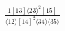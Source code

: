 \documentclass[varwidth, border=5pt]{standalone}
\begin{document}
\begin{my}
$\begin{gathered}
\scriptscriptstyle\frac{1[13]⟨23⟩^2[15]}{⟨12⟩[14]^2⟨34⟩⟨35⟩}
\end{gathered}$
\end{my}
\end{document}
